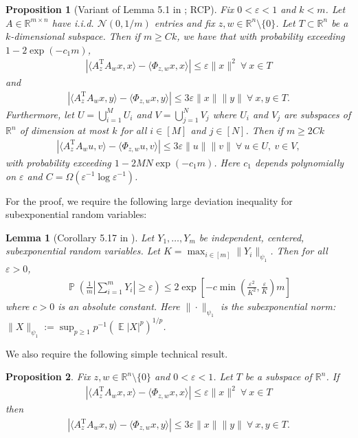 \documentclass[11pt]{article}
\renewcommand{\epsilon}{\varepsilon}
\newcommand{\R}{\mathbb{R}}
\newcommand{\E}{\operatorname{\mathbb{E}}}
\newcommand{\Pro}{\operatorname{\mathbb{P}}}
\renewcommand{\top}{{\mathrm{T}}}
\newtheorem{lem}{Lemma}
\newtheorem{prop}{Proposition}
\theoremstyle{remark}
\begin{document}
\begin{prop}[Variant of Lemma 5.1 in \cite{Baraniuk_lemma}; RCP] \label{RCPproposition} Fix $0 < \epsilon < 1$ and $k < m$. Let $A \in \R^{m \times n}$ have i.i.d. $\mathcal{N}(0,1/m)$ entries and fix $z,w \in \R^n \setminus \{0\}$. Let $T \subset \R^n$ be a $k$-dimensional subspace. Then if $m \geqslant C k$, we have that with probability exceeding $1 - 2\exp(-c_1 m)$, \begin{align}
|\langle A_z^\top A_w x, x \rangle - \langle \Phi_{z,w} x, x \rangle| \leqslant \epsilon \|x\|^2\ \forall\ x \in T 
\end{align} and \begin{align}
|\langle A_z^\top A_w x, y \rangle - \langle \Phi_{z,w} x, y \rangle| \leqslant 3\epsilon \|x\|\|y\|\ \forall\ x,y \in T. \label{RCP_3bound}
\end{align} Furthermore, let $U = \bigcup_{i=1}^M U_i$ and $V = \bigcup_{j=1}^N V_j$ where $U_i$ and $V_j$ are subspaces of $\R^n$ of dimension at most $k$ for all $i \in [M]$ and $j \in [N]$. Then if $m \geqslant 2Ck$
\begin{align}
\left|\langle  A_{z}^\top A_w u, v \rangle - \langle \Phi_{z,w} u,v\rangle\right| \leqslant 3\epsilon \|u\|\|v\|\ \forall\ u \in U,\ v \in V, 
\end{align} with probability exceeding $1 - 2MN\exp(-c_1 m)$. Here $c_1$ depends polynomially on $\epsilon$ and $C = \Omega(\epsilon^{-1}\log \epsilon^{-1})$.
\end{prop}
 For the proof, we require the following large deviation inequality for subexponential random variables: \begin{lem}[Corollary 5.17 in \cite{Vershynin_notes}] \label{subexpbound}
Let $Y_1,\dots,Y_m$ be independent, centered, subexponential random variables. Let $K = \max_{i \in[m]} \|Y_i\|_{\psi_1}$. Then for all $\epsilon > 0$, \begin{align*}
\Pro\left(\frac{1}{m} \left|\sum_{i=1}^m Y_i \right| \geqslant \epsilon \right) \leqslant 2 \exp\left[-c \min\left(\frac{\epsilon^2}{K^2}, \frac{\epsilon}{K}\right)m\right]
\end{align*} where $c > 0$ is an absolute constant. Here $\|\cdot\|_{\psi_1}$ is the subexponential norm: $\|X\|_{\psi_1} := \sup_{p \geqslant 1} p^{-1}\left(\E|X|^p\right)^{1/p}$.
\end{lem} \noindent We also require the following simple technical result.

\begin{prop}\label{tech_lemma} Fix $z,w \in \R^n \setminus \{0\}$ and $0 < \epsilon < 1$. Let $T$ be a subspace of $\R^n$. If 
\begin{align}\label{tech_hypothesis}
\left|\langle  A_z^\top A_w x,  x\rangle - \langle \Phi_{z,w} x, x\rangle\right| \leqslant \epsilon \|x\|^2\ \forall\ x \in T 
\end{align} then 
\begin{align*}
\left|\langle A_z^\top A_w x, y\rangle - \langle \Phi_{z,w} x, y\rangle\right| \leqslant 3\epsilon\|x\|\|y\|\ \forall\ x,y \in T.
\end{align*}
\end{prop}
\end{document}
